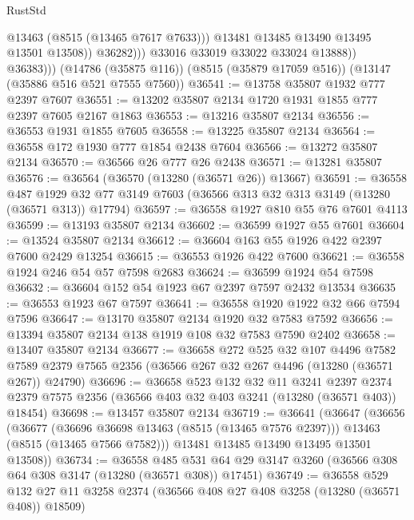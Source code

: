 \begin{lexlean}{RustStd}
\begin{coremodule}
                          @13463
                          (@8515 (@13465 @7617 @7633)))
                        @13481
                        @13485
                        @13490
                        @13495
                        @13501
                        @13508))
                    @36282)))
              @33016
              @33019
              @33022
              @33024
              @13888))
          @36383)))
    (@14786 (@35875 @116))
    (@8515 (@35879 @17059 @516))
    (@13147 (@35886 @516 @521 @7555 @7560))
@36541 := @13758 @35807 @1932 @777 @2397 @7607
@36551 := @13202 @35807 @2134 @1720 @1931 @1855 @777 @2397 @7605 @2167 @1863
@36553 := @13216 @35807 @2134
@36556 := @36553 @1931 @1855 @7605
@36558 := @13225 @35807 @2134
@36564 := @36558 @172 @1930 @777 @1854 @2438 @7604
@36566 := @13272 @35807 @2134
@36570 := @36566 @26 @777 @26 @2438
@36571 := @13281 @35807
@36576 := @36564 (@36570 (@13280 (@36571 @26)) @13667)
@36591 := @36558
    @487
    @1929
    @32
    @77
    @3149
    @7603
    (@36566 @313 @32 @313 @3149 (@13280 (@36571 @313)) @17794)
@36597 := @36558 @1927 @810 @55 @76 @7601 @4113
@36599 := @13193 @35807 @2134
@36602 := @36599 @1927 @55 @7601
@36604 := @13524 @35807 @2134
@36612 := @36604 @163 @55 @1926 @422 @2397 @7600 @2429 @13254
@36615 := @36553 @1926 @422 @7600
@36621 := @36558 @1924 @246 @54 @57 @7598 @2683
@36624 := @36599 @1924 @54 @7598
@36632 := @36604 @152 @54 @1923 @67 @2397 @7597 @2432 @13534
@36635 := @36553 @1923 @67 @7597
@36641 := @36558 @1920 @1922 @32 @66 @7594 @7596
@36647 := @13170 @35807 @2134 @1920 @32 @7583 @7592
@36656 := @13394 @35807 @2134 @138 @1919 @108 @32 @7583 @7590 @2402
@36658 := @13407 @35807 @2134
@36677 := @36658
    @272
    @525
    @32
    @107
    @4496
    @7582
    @7589
    @2379
    @7565
    @2356
    (@36566 @267 @32 @267 @4496 (@13280 (@36571 @267)) @24790)
@36696 := @36658
    @523
    @132
    @32
    @11
    @3241
    @2397
    @2374
    @2379
    @7575
    @2356
    (@36566 @403 @32 @403 @3241 (@13280 (@36571 @403)) @18454)
@36698 := @13457 @35807 @2134
@36719 := @36641
    (@36647
      (@36656
        (@36677
          (@36696 @36698 @13463 (@8515 (@13465 @7576 @2397)))
          @13463
          (@8515 (@13465 @7566 @7582)))
        @13481
        @13485
        @13490
        @13495
        @13501
        @13508))
@36734 := @36558
    @485
    @531
    @64
    @29
    @3147
    @3260
    (@36566 @308 @64 @308 @3147 (@13280 (@36571 @308)) @17451)
@36749 := @36558
    @529
    @132
    @27
    @11
    @3258
    @2374
    (@36566 @408 @27 @408 @3258 (@13280 (@36571 @408)) @18509)

\end{coremodule}
\end{lexlean}
